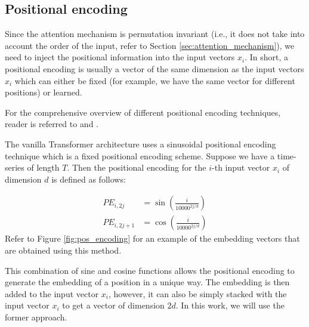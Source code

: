 \documentclass[a4paper, twoside]{report}
\theoremstyle{definition}
\numberwithin{equation}{section}
\begin{document}
\subsection{Positional encoding}

Since the attention mechanism is permutation invariant
(i.e., it does not take into account the order of the input, refer to Section \ref{sec:attention_mechanism}),
we need to inject the positional information into the input vectors $x_i$.
In short, a positional encoding is usually a vector of the same dimension as the input vectors $x_i$
which can either be fixed (for example, we have the same vector for different positions) or learned.

For the comprehensive overview of different positional encoding techniques, reader
is referred to \cite{Dufter2021PositionII} and \cite{Weng_2023}.

The vanilla Transformer architecture uses a sinusoidal positional encoding technique
which is a fixed positional encoding scheme. Suppose we have a time-series of length $T$.
Then the positional encoding for the $i$-th input vector $x_i$ of dimension $d$ is defined as follows:

\begin{equation}
    \begin{array}{rll}
        PE_{i, 2j}   & = \sin(\frac{i}{10000^{2j/d}}) \\
        PE_{i, 2j+1} & = \cos(\frac{i}{10000^{2j/d}})
    \end{array}
\end{equation}
Refer to Figure \ref{fig:pos_encoding} for an example of the embedding vectors that
are obtained using this method.

This combination of sine and cosine functions allows the positional encoding to
generate the embedding of a position in a unique way. The embedding is then
added to the input vector $x_i$, however, it can also be simply stacked with the input vector $x_i$
to get a vector of dimension $2d$. In this work, we will use the former approach.
\end{document}
